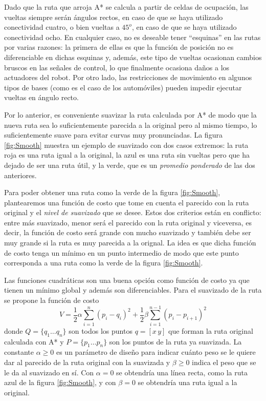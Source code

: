 Dado que la ruta que arroja A* se calcula a partir de celdas de ocupación, las vueltas siempre serán ángulos rectos, en caso de que se haya utilizado conectividad cuatro, o bien vueltas a $45^o$, en caso de que se haya utilizado conectividad ocho. En cualquier caso, no es deseable tener ``esquinas'' en las rutas por varias razones: la primera de ellas es que la función de posición no es diferenciable en dichas esquinas y, además, este tipo de vueltas ocasionan cambios bruscos en las señales de control, lo que finalmente ocasiona daños a los actuadores del robot. Por otro lado, las restricciones de movimiento en algunos tipos de bases (como es el caso de los automóviles) pueden impedir ejecutar vueltas en ángulo recto.

Por lo anterior, es conveniente suavizar la ruta calculada por A* de modo que la nueva ruta sea lo suficientemente parecida a la original pero al mismo tiempo, lo suficientemente suave para evitar curvas muy pronunciadas. La figura \ref{fig:Smooth} muestra un ejemplo de suavizado con dos casos extremos: la ruta roja es una ruta igual a la original, la azul es una ruta sin vueltas pero que ha dejado de ser una ruta útil, y la verde, que es un \textit{promedio ponderado} de las dos anteriores. 

Para poder obtener una ruta como la verde de la figura \ref{fig:Smooth}, plantearemos una función de costo que tome en cuenta el parecido con la ruta original y el \textit{nivel de suavizado} que se desee. Estos dos criterios están en conflicto: entre más suavizado, menor será el parecido con la ruta original y viceversa, es decir, la función de costo será grande con mucho suavizado y también debe ser muy grande si la ruta es muy parecida a la orignal. La idea es que dicha función de costo tenga un mínimo en un punto intermedio de modo que este punto corresponda a una ruta como la verde de la figura \ref{fig:Smooth}. 

Las funciones cuadráticas son una buena opción como función de costo ya que tienen un mínimo global y además son diferenciables. Para el suavizado de la ruta se propone la función de costo
\begin{equation}
V = \frac{1}{2}\alpha\sum_{i=1}^{n}\left(p_i - q_i\right)^2 + \frac{1}{2}\beta\sum_{i=1}^{n-1}\left(p_i - p_{i+1}\right)^2
\label{eq:Cost}
\end{equation}
donde $Q = \{q_1\dots q_n\}$ son todos los puntos $q = [x\,y]$ que forman la ruta original calculada con A* y $P=\{p_1\dots p_n\}$ son los puntos de la ruta ya suavizada. La constante $\alpha \geq 0$ es un parámetro de diseño para indicar cuánto peso se le quiere dar al parecido de la ruta original con la suavizada y $\beta \geq 0$ indica el peso que se le da al suavizado en sí. Con $\alpha = 0$ se obtendría una línea recta, como la ruta azul de la figura \ref{fig:Smooth}, y con $\beta = 0$ se obtendría una ruta igual a la original.


